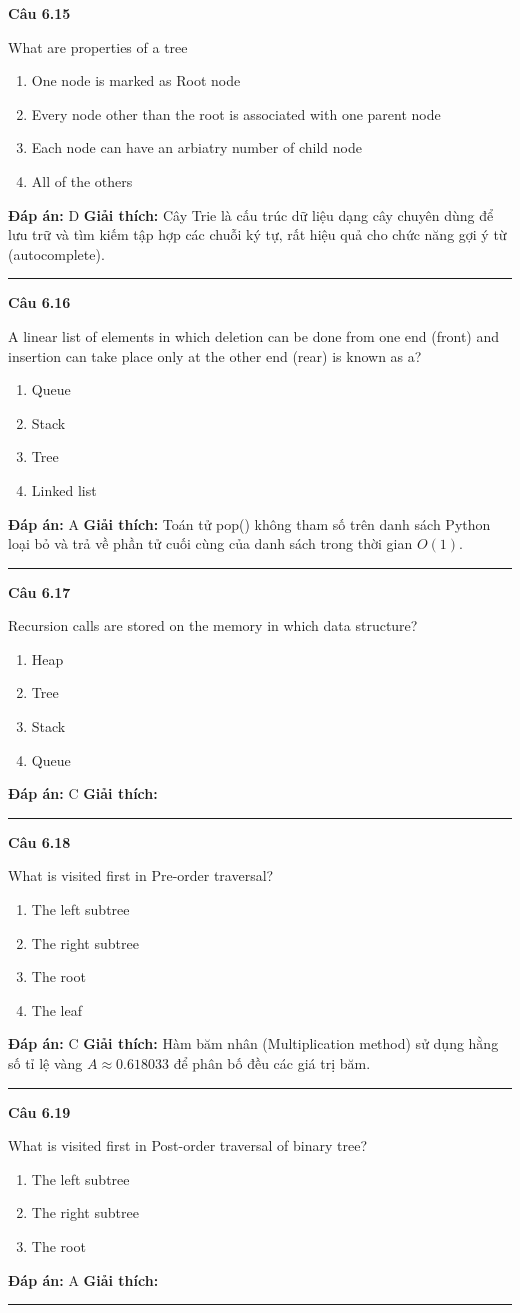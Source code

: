 \documentclass[11pt,a4paper]{article}
\newenvironment{question}[1]{%
  \par\vspace{1em}\noindent\textbf{\large Câu #1}\par\vspace{0.4em}
}{%
  \par\vspace{1em}\hrule\vspace{0.6em}
}
\newenvironment{choices}{%
  \begin{enumerate}[label=\textbf{\Alph*.},leftmargin=2.2em,itemsep=2pt,topsep=3pt]
}{%
  \end{enumerate}
}
\newcommand{\choice}{\item}
\begin{document}
\begin{question}{6.15}
What are properties of a tree
\begin{choices}
\choice One node is marked as Root node
\choice Every node other than the root is associated with one parent node
\choice Each node can have an arbiatry number of child node
\choice All of the others
\end{choices}
\textbf{Đáp án:} D
\textbf{Giải thích:} Cây Trie là cấu trúc dữ liệu dạng cây chuyên dùng để lưu trữ và tìm kiếm tập hợp các chuỗi ký tự, rất hiệu quả cho chức năng gợi ý từ (autocomplete).
\end{question}

\begin{question}{6.16}
A linear list of elements in which deletion can be done from one end (front) and insertion can take place only at the other end (rear) is known as a?
\begin{choices}
\choice Queue
\choice Stack
\choice Tree
\choice Linked list
\end{choices}
\textbf{Đáp án:} A
\textbf{Giải thích:} Toán tử pop() không tham số trên danh sách Python loại bỏ và trả về phần tử cuối cùng của danh sách trong thời gian \(O(1)\).
\end{question}

\begin{question}{6.17}
Recursion calls are stored on the memory in which data structure?
\begin{choices}
\choice Heap
\choice Tree
\choice Stack
\choice Queue
\end{choices}
\textbf{Đáp án:} C
\textbf{Giải thích:} 
\end{question}

\begin{question}{6.18}
What is visited first in Pre-order traversal?
\begin{choices}
\choice The left subtree
\choice The right subtree
\choice The root
\choice The leaf
\end{choices}
\textbf{Đáp án:} C
\textbf{Giải thích:} Hàm băm nhân (Multiplication method) sử dụng hằng số tỉ lệ vàng \(A \approx 0.618033\) để phân bố đều các giá trị băm.
\end{question}

\begin{question}{6.19}
What is visited first in Post-order traversal of binary tree?
\begin{choices}
\choice The left subtree
\choice The right subtree
\choice The root
\end{choices}
\textbf{Đáp án:} A
\textbf{Giải thích:} 
\end{question}
\end{document}
